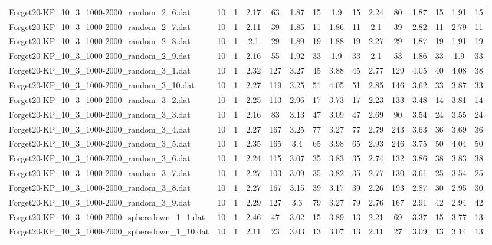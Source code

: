 \begin{table}[!ht]
{\begin{tabular}{lcccccccccccccc}
Forget20-KP\_10\_3\_1000-2000\_random\_2\_6.dat & 10 & 1 & 2.17 & 63 & 1.87 & 15 & 1.9 & 15 & 2.24 & 80 & 1.87 & 15 & 1.91 & 15 \\
Forget20-KP\_10\_3\_1000-2000\_random\_2\_7.dat & 10 & 1 & 2.11 & 39 & 1.85 & 11 & 1.86 & 11 & 2.1 & 39 & 2.82 & 11 & 2.79 & 11 \\
Forget20-KP\_10\_3\_1000-2000\_random\_2\_8.dat & 10 & 1 & 2.1 & 29 & 1.89 & 19 & 1.88 & 19 & 2.27 & 29 & 1.87 & 19 & 1.91 & 19 \\
Forget20-KP\_10\_3\_1000-2000\_random\_2\_9.dat & 10 & 1 & 2.16 & 55 & 1.92 & 33 & 1.9 & 33 & 2.1 & 53 & 1.86 & 33 & 1.9 & 33 \\
Forget20-KP\_10\_3\_1000-2000\_random\_3\_1.dat & 10 & 1 & 2.32 & 127 & 3.27 & 45 & 3.88 & 45 & 2.77 & 129 & 4.05 & 40 & 4.08 & 38 \\
Forget20-KP\_10\_3\_1000-2000\_random\_3\_10.dat & 10 & 1 & 2.27 & 119 & 3.25 & 51 & 4.05 & 51 & 2.85 & 146 & 3.62 & 33 & 3.87 & 33 \\
Forget20-KP\_10\_3\_1000-2000\_random\_3\_2.dat & 10 & 1 & 2.25 & 113 & 2.96 & 17 & 3.73 & 17 & 2.23 & 133 & 3.48 & 14 & 3.81 & 14 \\
Forget20-KP\_10\_3\_1000-2000\_random\_3\_3.dat & 10 & 1 & 2.16 & 83 & 3.13 & 47 & 3.09 & 47 & 2.69 & 90 & 3.54 & 24 & 3.55 & 24 \\
Forget20-KP\_10\_3\_1000-2000\_random\_3\_4.dat & 10 & 1 & 2.27 & 167 & 3.25 & 77 & 3.27 & 77 & 2.79 & 243 & 3.63 & 36 & 3.69 & 36 \\
Forget20-KP\_10\_3\_1000-2000\_random\_3\_5.dat & 10 & 1 & 2.35 & 165 & 3.4 & 65 & 3.98 & 65 & 2.93 & 246 & 3.75 & 50 & 4.04 & 50 \\
Forget20-KP\_10\_3\_1000-2000\_random\_3\_6.dat & 10 & 1 & 2.24 & 115 & 3.07 & 35 & 3.83 & 35 & 2.74 & 132 & 3.86 & 38 & 3.83 & 38 \\
Forget20-KP\_10\_3\_1000-2000\_random\_3\_7.dat & 10 & 1 & 2.27 & 103 & 3.09 & 35 & 3.82 & 35 & 2.77 & 130 & 3.61 & 25 & 3.54 & 25 \\
Forget20-KP\_10\_3\_1000-2000\_random\_3\_8.dat & 10 & 1 & 2.27 & 167 & 3.15 & 39 & 3.17 & 39 & 2.26 & 193 & 2.87 & 30 & 2.95 & 30 \\
Forget20-KP\_10\_3\_1000-2000\_random\_3\_9.dat & 10 & 1 & 2.29 & 127 & 3.3 & 79 & 3.27 & 79 & 2.76 & 167 & 2.91 & 42 & 2.94 & 42 \\
Forget20-KP\_10\_3\_1000-2000\_spheredown\_1\_1.dat & 10 & 1 & 2.46 & 47 & 3.02 & 15 & 3.89 & 13 & 2.21 & 69 & 3.37 & 15 & 3.77 & 13 \\
Forget20-KP\_10\_3\_1000-2000\_spheredown\_1\_10.dat & 10 & 1 & 2.11 & 23 & 3.03 & 13 & 3.07 & 13 & 2.11 & 27 & 3.09 & 13 & 3.14 & 13 \\

\end{tabular}}
\end{table}
